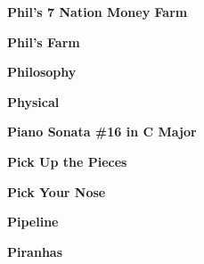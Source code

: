 \newline
\vspace{10pt} 
\begin{center}\textbf{Phil's 7 Nation Money Farm}\end{center}
\newline
\vspace{10pt} 
\begin{center}\textbf{Phil's Farm}\end{center}
\newline
\vspace{10pt} 
\begin{center}\textbf{Philosophy}\end{center}
\newline
\vspace{10pt} 
\begin{center}\textbf{Physical}\end{center}
\newline
\vspace{10pt} 
\begin{center}\textbf{Piano Sonata \#16 in C Major}\end{center}
\newline
\vspace{10pt} 
\begin{center}\textbf{Pick Up the Pieces}\end{center}
\newline
\vspace{10pt} 
\begin{center}\textbf{Pick Your Nose}\end{center}
\newline
\vspace{10pt} 
\begin{center}\textbf{Pipeline}\end{center}
\newline
\vspace{10pt} 
\begin{center}\textbf{Piranhas}\end{center}
\newline
\vspace{10pt} 
